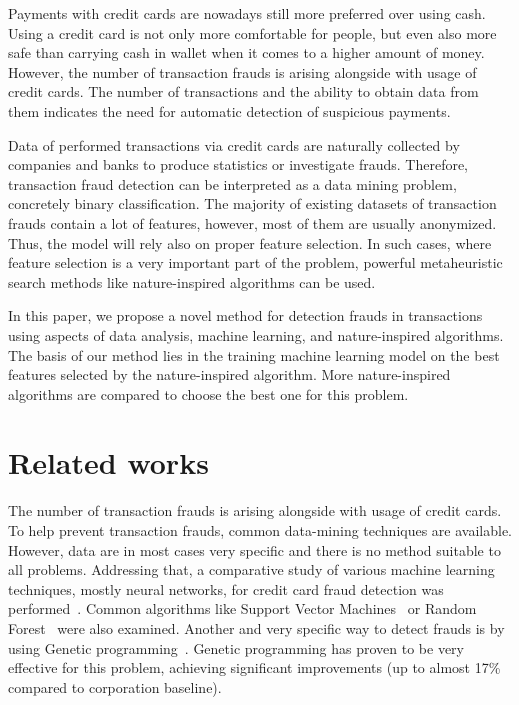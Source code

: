 \documentclass[runningheads]{llncs}
\begin{document}
Payments with credit cards are nowadays still more preferred over using cash. Using a credit card is not only more comfortable for people, but even also more safe than carrying cash in wallet when it comes to a higher amount of money. However, the number of transaction frauds is arising alongside with usage of credit cards. The number of transactions and the ability to obtain data from them indicates the need for automatic detection of suspicious payments.

Data of performed transactions via credit cards are naturally collected by companies and banks to produce statistics or investigate frauds. Therefore, transaction fraud detection can be interpreted as a data mining problem, concretely binary classification. The majority of existing datasets of transaction frauds contain a lot of features, however, most of them are usually anonymized. Thus, the model will rely also on proper feature selection. In such cases, where feature selection is a very important part of the problem, powerful metaheuristic search methods like nature-inspired algorithms can be used.

In this paper, we propose a novel method for detection frauds in transactions using aspects of data analysis, machine learning, and nature-inspired algorithms. The basis of our method lies in the training machine learning model on the best features selected by the nature-inspired algorithm. More nature-inspired algorithms are compared to choose the best one for this problem.


\section{Related works}

The number of transaction frauds is arising alongside with usage of credit cards. To help prevent transaction frauds, common data-mining techniques are available. However, data are in most cases very specific and there is no method suitable to all problems. Addressing that, a comparative study of various machine learning techniques, mostly neural networks, for credit card fraud detection was performed~\cite{Sadgali2019}. Common algorithms like Support Vector Machines~\cite{Wiese2009} or Random Forest~\cite{Xuan2018} were also examined. Another and very specific way to detect frauds is by using Genetic programming~\cite{Assis2013}. Genetic programming has proven to be very effective for this problem, achieving significant improvements (up to almost 17\% compared to corporation baseline).
\end{document}
